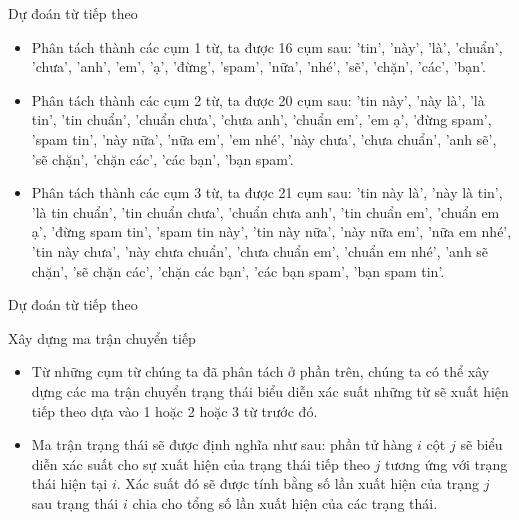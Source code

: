 \begin{frame}{Dự đoán từ tiếp theo}
\begin{itemize}
    \item[\bullet] Phân tách thành các cụm 1 từ, ta được 16 cụm sau: 
    'tin', 'này', 'là', 'chuẩn', 'chưa', 'anh', 'em', 'ạ', 'đừng', 'spam', 'nữa', 'nhé', 'sẽ', 'chặn', 'các', 'bạn'.
    \item[\bullet] Phân tách thành các cụm 2 từ, ta được 20 cụm sau: 'tin này', 'này là', 'là tin', 'tin chuẩn', 'chuẩn chưa', 'chưa anh', 'chuẩn em', 'em ạ', 'đừng spam', 'spam tin', 'này nữa', 'nữa em', 'em nhé', 'này chưa', 'chưa chuẩn', 'anh sẽ', 'sẽ chặn', 'chặn các', 'các bạn', 'bạn spam'.
    \item[\bullet] Phân tách thành các cụm 3 từ, ta được 21 cụm sau: 'tin này là', 'này là tin', 'là tin chuẩn', 'tin chuẩn chưa', 'chuẩn chưa anh', 'tin chuẩn em', 'chuẩn em ạ', 'đừng spam tin', 'spam tin này', 'tin này nữa', 'này nữa em', 'nữa em nhé', 'tin này chưa', 'này chưa chuẩn', 'chưa chuẩn em', 'chuẩn em nhé', 'anh sẽ chặn', 'sẽ chặn các', 'chặn các bạn', 'các bạn spam', 'bạn spam tin'.

\end{itemize}

\end{frame}

\begin{frame}{Dự đoán từ tiếp theo}
{
\begin{LARGE}
    Xây dựng ma trận chuyển tiếp \par
\end{LARGE}
\begin{itemize}
    \item[\bullet] Từ những cụm từ chúng ta đã phân tách ở phần trên, chúng ta có thể xây dựng các ma trận chuyển trạng thái biểu diễn xác suất những từ sẽ xuất hiện tiếp theo dựa vào 1 hoặc 2 hoặc 3 từ trước đó. 
    \item[\bullet] Ma trận trạng thái sẽ được định nghĩa như sau: phần tử hàng $i$ cột $j$ sẽ biểu diễn xác suất cho sự xuất hiện của trạng thái tiếp theo $j$ tương ứng với trạng thái hiện tại $i.$ Xác suất đó sẽ được tính bằng số lần xuất hiện của trạng $j$ sau trạng thái $i$ chia cho tổng số lần xuất hiện của các trạng thái.
\end{itemize}
}
\end{frame}

